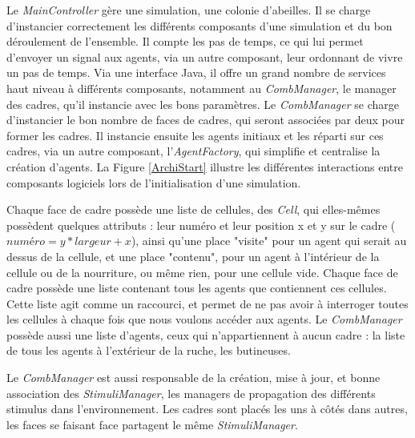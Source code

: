 			Le \textit{MainController} gère une simulation, une colonie d'abeilles. Il se charge d'instancier correctement les différents composants d'une simulation et du bon déroulement de l'ensemble. Il compte les pas de temps, ce qui lui permet d'envoyer un signal aux agents, via un autre composant, leur ordonnant de vivre un pas de temps. Via une interface Java, il offre un grand nombre de services haut niveau à différents composants, notamment au \textit{CombManager}, le manager des cadres, qu'il instancie avec les bons paramètres. Le \textit{CombManager} se charge d'instancier le bon nombre de faces de cadres, qui seront associées par deux pour former les cadres. Il instancie ensuite les agents initiaux et les réparti sur ces cadres, via un autre composant, l'\textit{AgentFactory}, qui simplifie et centralise la création d'agents. La Figure \ref{ArchiStart} illustre les différentes interactions entre composants logiciels lors de l'initialisation d'une simulation.
			
			Chaque face de cadre possède une liste de cellules, des \textit{Cell}, qui elles-mêmes possèdent quelques attributs : leur numéro et leur position x et y sur le cadre ($numéro = y * largeur + x$), ainsi qu'une place "visite" pour un agent qui serait au dessus de la cellule, et une place "contenu", pour un agent à l'intérieur de la cellule ou de la nourriture, ou même rien, pour une cellule vide. Chaque face de cadre possède une liste contenant tous les agents que contiennent ces cellules. Cette liste agit comme un raccourci, et permet de ne pas avoir à interroger toutes les cellules à chaque fois que nous voulons accéder aux agents. Le \textit{CombManager} possède aussi une liste d'agents, ceux qui n'appartiennent à aucun cadre : la liste de tous les agents à l'extérieur de la ruche, les butineuses.
			
			Le \textit{CombManager} est aussi responsable de la création, mise à jour, et bonne association des \textit{StimuliManager}, les managers de propagation des différents stimulus dans l'environnement. Les cadres sont placés les uns à côtés dans autres, les faces se faisant face partagent le même \textit{StimuliManager}. 
			
			
